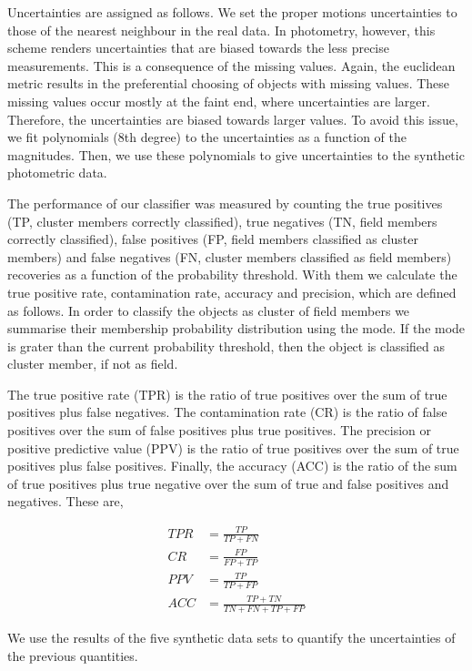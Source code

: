 Uncertainties are assigned as follows. We set the proper motions uncertainties to those of the nearest neighbour in the real data. In photometry, however, this scheme renders uncertainties that are biased towards the less precise measurements. This is a consequence of the missing values. Again, the euclidean metric results in the preferential choosing of objects with missing values. These missing values occur mostly at the faint end, where uncertainties are larger. Therefore, the uncertainties are biased towards larger values. To avoid this issue, we fit polynomials (8th degree) to the uncertainties as a function of the magnitudes. Then, we use these polynomials to give uncertainties to the synthetic photometric data.

The performance of our classifier was measured by counting the true positives (TP, cluster members correctly classified), true negatives (TN, field members correctly classified), false positives (FP, field members classified as cluster members) and false negatives (FN, cluster members classified as field members) recoveries as a function of the probability threshold. With them we calculate the true positive rate, contamination rate, accuracy and precision, which are defined as follows. In order to classify the objects as cluster of field members we summarise their membership probability distribution using the mode. If the mode is grater than the current probability threshold, then the object is classified as cluster member, if not as field.

The true positive rate (TPR) is the ratio of true positives over the sum of true positives plus false negatives. The contamination rate (CR) is the ratio of false positives over the sum of false positives plus true positives. The precision or positive predictive value (PPV) is the ratio of true positives over the sum of true positives plus false positives. Finally, the accuracy (ACC) is the ratio of the sum of true positives plus true negative over the sum of true and false positives and negatives. These are,

\begin{align}
TPR &= \frac{TP}{TP+FN} \nonumber \\
CR   &= \frac{FP}{FP+TP} \nonumber \\
PPV &= \frac{TP}{TP+FP} \nonumber \\
ACC &= \frac{TP+TN}{TN+FN+TP+FP} \nonumber
\end{align}

We use the results of the five synthetic data sets to quantify the uncertainties of the previous quantities. 

